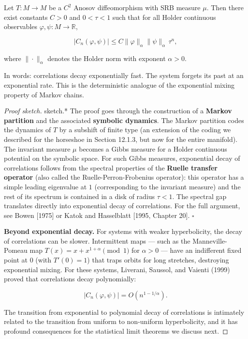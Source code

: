 \begin{theorem}\label{thm:12.11}
Let $T: M \to M$ be a $C^2$ Anosov diffeomorphism with SRB measure $\mu$. Then there exist constants $C > 0$ and $0 < \tau < 1$ such that for all Holder continuous observables $\varphi, \psi: M \to \mathbb{R}$,

\[
|C_n(\varphi, \psi)| \leq C \|\varphi\|_\alpha \|\psi\|_\alpha \, \tau^n,
\]

where $\|\cdot\|_\alpha$ denotes the Holder norm with exponent $\alpha > 0$.

In words: correlations decay exponentially fast. The system forgets its past at an exponential rate. This is the deterministic analogue of the exponential mixing property of Markov chains.
\end{theorem}


\begin{proof}[Proof sketch]
sketch.* The proof goes through the construction of a \textbf{Markov partition} and the associated \textbf{symbolic dynamics}. The Markov partition codes the dynamics of $T$ by a subshift of finite type (an extension of the coding we described for the horseshoe in Section 12.1.3, but now for the entire manifold). The invariant measure $\mu$ becomes a Gibbs measure for a Holder continuous potential on the symbolic space. For such Gibbs measures, exponential decay of correlations follows from the spectral properties of the \textbf{Ruelle transfer operator} (also called the Ruelle-Perron-Frobenius operator): this operator has a simple leading eigenvalue at $1$ (corresponding to the invariant measure) and the rest of its spectrum is contained in a disk of radius $\tau < 1$. The spectral gap translates directly into exponential decay of correlations. For the full argument, see Bowen [1975] or Katok and Hasselblatt [1995, Chapter 20]. $\square$

\textbf{Beyond exponential decay.} For systems with weaker hyperbolicity, the decay of correlations can be slower. Intermittent maps --- such as the Manneville-Pomeau map $T(x) = x + x^{1+\alpha} \pmod{1}$ for $\alpha > 0$ --- have an indifferent fixed point at $0$ (with $T'(0) = 1$) that traps orbits for long stretches, destroying exponential mixing. For these systems, Liverani, Saussol, and Vaienti (1999) proved that correlations decay polynomially:

\[
|C_n(\varphi, \psi)| = O(n^{1 - 1/\alpha}).
\]

The transition from exponential to polynomial decay of correlations is intimately related to the transition from uniform to non-uniform hyperbolicity, and it has profound consequences for the statistical limit theorems we discuss next.


\end{proof}

